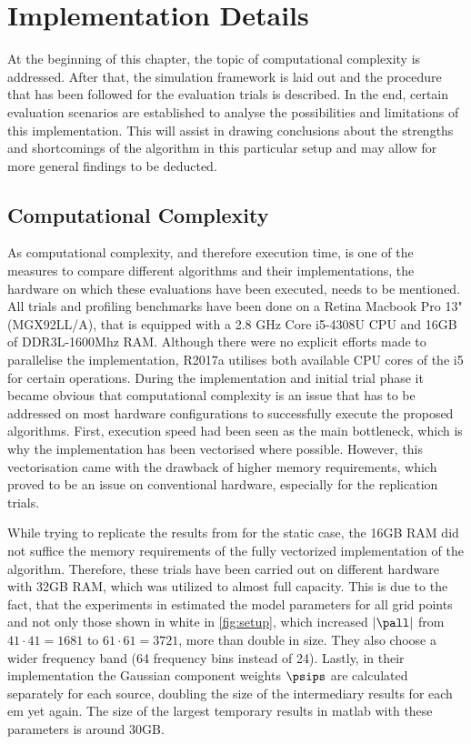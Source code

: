 \section{Implementation Details}
\label{chap:implementation}

At the beginning of this chapter, the topic of computational complexity is addressed. After that, the simulation framework is laid out and the procedure that has been followed for the evaluation trials is described. In the end, certain evaluation scenarios are established to analyse the possibilities and limitations of this implementation. This will assist in drawing conclusions about the strengths and shortcomings of the algorithm in this particular setup and may allow for more general findings to be deducted.

\subsection{Computational Complexity}\label{sec:computationalComplexity} As computational complexity, and therefore execution time, is one of the measures to compare different algorithms and their implementations, the hardware on which these evaluations have been executed, needs to be mentioned. All trials and profiling benchmarks have been done on a Retina Macbook Pro 13" (MGX92LL/A), that is equipped with a 2.8 GHz Core i5-4308U CPU and 16GB of DDR3L-1600Mhz RAM. Although there were no explicit efforts made to parallelise the implementation, \matlab R2017a utilises both available CPU cores of the i5 for certain operations. During the implementation and initial trial phase it became obvious that computational complexity is an issue that has to be addressed on most hardware configurations to successfully execute the proposed algorithms. First, execution speed had been seen as the main bottleneck, which is why the implementation has been vectorised where possible. However, this vectorisation came with the drawback of higher memory requirements, which proved to be an issue on conventional hardware, especially for the replication trials.


While trying to replicate the results from \cite{Schwartz2014} for the static case, the 16GB RAM did not suffice the memory requirements of the fully vectorized implementation of the algorithm. Therefore, these trials have been carried out on different hardware with 32GB RAM, which was utilized to almost full capacity. This is due to the fact, that the experiments in \cite{Schwartz2014} estimated the model parameters for all grid points and not only those shown in white in \autoref{fig:setup}, which increased $|\pall|$ from $41 \cdot 41 = 1681$ to $61\cdot61=3721$, more than double in size. They also choose a wider frequency band (64 frequency bins instead of 24). Lastly, in their implementation the Gaussian component weights $\psips$ are calculated separately for each source, doubling the size of the intermediary results for each \gls{em} yet again. The size of the largest temporary results in matlab with these parameters is around $30$GB.
